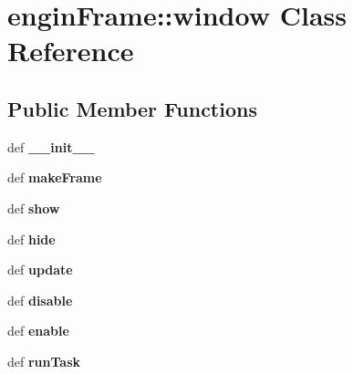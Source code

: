 \section{engin\-Frame::window Class Reference}
\label{classenginFrame_1_1window}
\subsection*{Public Member Functions}
\begin{CompactItemize}
\item 
def \textbf{\_\-\_\-init\_\-\_\-}\label{classenginFrame_1_1window_dff1502cf3315e4d696da726ef5ff9c4}

\item 
def \textbf{make\-Frame}\label{classenginFrame_1_1window_dcfb7d7047f7d4974ec2c859c4ec4193}

\item 
def \textbf{show}\label{classenginFrame_1_1window_7144f17c367253a628d99e29c6743621}

\item 
def \textbf{hide}\label{classenginFrame_1_1window_1244e0a4dcf3db9c027ccbb5091d852d}

\item 
def \textbf{update}\label{classenginFrame_1_1window_974988f74537467a0e064f7495f4e86c}

\item 
def \textbf{disable}\label{classenginFrame_1_1window_e817a5f913a27ff75d20b5c456104561}

\item 
def \textbf{enable}\label{classenginFrame_1_1window_026f8b0d8d1e6c1035faf7b9e215f0b1}

\item 
def \textbf{run\-Task}\label{classenginFrame_1_1window_a3da27cfd404abe2f584a74bf6c7afe7}

\end{CompactItemize}
